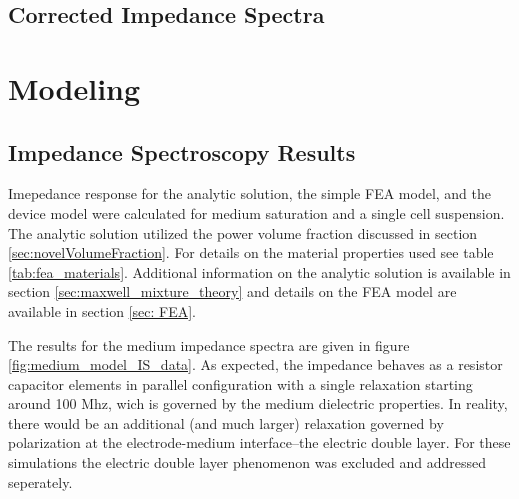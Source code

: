 \FloatBarrier

\subsection{Corrected Impedance Spectra}

\FloatBarrier

\section{Modeling}

\subsection{Impedance Spectroscopy Results}

\par Imepedance response for the analytic solution, the simple FEA model, and the device model were calculated for medium saturation and a single cell suspension. The analytic solution utilized the power volume fraction discussed in section \ref{sec:novelVolumeFraction}. For details on the material properties used see table \ref{tab:fea_materials}. Additional information on the analytic solution is available in section \ref{sec:maxwell_mixture_theory} and details on the FEA model are available in section \ref{sec: FEA}. 

\par The results for the medium impedance spectra are given in figure \ref{fig:medium_model_IS_data}. As expected, the impedance behaves as a resistor capacitor elements in parallel configuration with a single relaxation starting around 100 Mhz, wich is governed by the medium dielectric properties. In reality, there would be an additional (and much larger) relaxation governed by polarization at the electrode-medium interface--the electric double layer. For these simulations the electric double layer phenomenon was excluded and addressed seperately.

